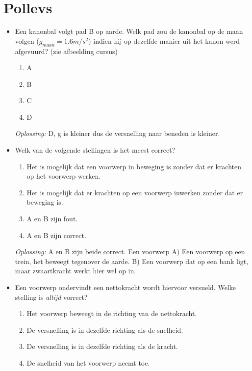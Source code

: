 \documentclass[12pt,a4paper]{article}
\begin{document}
    \section{Pollevs}
    \begin{itemize}
    \renewcommand\labelitemi{--}
    \item Een kanonbal volgt pad B op aarde. Welk pad zou de kanonbal op de maan volgen (\(g_{maan} = 1.6m/s^2\)) indien hij op dezelfde manier uit het kanon werd afgevuurd? (zie afbeelding cursus)
    \begin{enumerate}
    	[label=\alph*)]
    	\item A
    	\item B
    	\item C
    	\item D
    \end{enumerate}
    \textit{Oplossing:} D, g is kleiner dus de versnelling naar beneden is kleiner.
    \newline
    \item Welk van de volgende stellingen is het meest correct?
    \begin{enumerate}[label=\alph*]
    	\item Het is mogelijk dat een voorwerp in beweging is zonder dat er krachten op het voorwerp werken.
    	\item Het is mogelijk dat er krachten op een voorwerp inwerken zonder dat er beweging is.
    	\item A en B zijn fout.
    	\item A en B zijn correct.
    \end{enumerate}
    \textit{Oplossing:} A en B zijn beide correct. Een voorwerp A) Een voorwerp op een trein, het beweegt tegenover de aarde. B) Een voorwerp dat op een bank ligt, maar zwaartkracht werkt hier wel op in.
    \newline
    \item Een voorwerp ondervindt een nettokracht wordt hiervoor versneld. Welke stelling is \textit{altijd} vorrect?
    \begin{enumerate}[label=\alph*]
    	\item Het voorwerp beweegt in de richting van de nettokracht.
    	\item De versnelling is in dezelfde richting als de snelheid.
    	\item De versnelling is in dezelfde richting als de kracht.
    	\item De snelheid van het voorwerp neemt toe.
    \end{enumerate}

\end{itemize}
\end{document}
